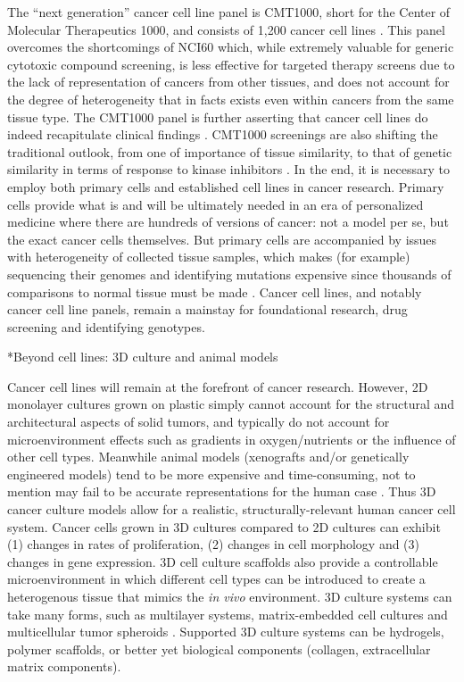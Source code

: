 \documentclass[12pt]{article}
\makeatletter
\renewcommand\subsection{\@startsection
	{subsection}{2}{0mm}
	{-0.05in}
	{-0.5\baselineskip}
	{\normalfont\normalsize\bfseries}}
\makeatother
\begin{document}
The \textquotedblleft next generation\textquotedblright \: cancer cell line panel is CMT1000, short for the Center of Molecular Therapeutics 1000, and consists of 1,200 cancer cell lines \cite{Sharma2010}. This panel overcomes the shortcomings of NCI60 which, while extremely valuable for generic cytotoxic compound screening, is less effective for targeted therapy screens due to the lack of representation of cancers from other tissues, and does not account for the degree of heterogeneity that in facts exists even within cancers from the same tissue type. The CMT1000 panel is further asserting that cancer cell lines do indeed recapitulate clinical findings \cite{Sharma2010}. CMT1000 screenings are also shifting the traditional outlook, from one of importance of tissue similarity, to that of genetic similarity in terms of response to kinase inhibitors \cite{Sharma2010}. In the end, it is necessary to employ both primary cells and established cell lines in cancer research. Primary cells provide what is and will be ultimately needed in an era of personalized medicine where there are hundreds of versions of cancer: not a model per se, but the exact cancer cells themselves. But primary cells are accompanied by issues with heterogeneity of collected tissue samples, which makes (for example) sequencing their genomes and identifying mutations expensive since thousands of comparisons to normal tissue must be made \cite{Borrell2010}. Cancer cell lines, and notably cancer cell line panels, remain a mainstay for foundational research, drug screening and identifying genotypes.
 
\subsection*{Beyond cell lines: 3D culture and animal models} 

Cancer cell lines will remain at the forefront of cancer research. However, 2D monolayer cultures grown on plastic simply cannot account for the structural and architectural aspects of solid tumors, and typically do not account for microenvironment effects such as gradients in oxygen/nutrients or the influence of other cell types. Meanwhile animal models (xenografts and/or genetically engineered models) tend to be more expensive and time-consuming, not to mention may fail to be accurate representations for the human case \cite{Worp2010}. Thus 3D cancer culture models allow for a realistic, structurally-relevant human cancer cell system. Cancer cells grown in 3D cultures compared to 2D cultures can exhibit (1) changes in rates of proliferation, (2) changes in cell morphology and (3) changes in gene expression. 3D cell culture scaffolds also provide a controllable microenvironment in which different cell types can be introduced to create a heterogenous tissue that mimics the \textit{in vivo} environment. 3D culture systems can take many forms, such as multilayer systems, matrix-embedded cell cultures and multicellular tumor spheroids \cite{Sharma2010}. Supported 3D culture systems can be hydrogels, polymer scaffolds, or better yet biological components (collagen, extracellular matrix components).
	
\end{document}
